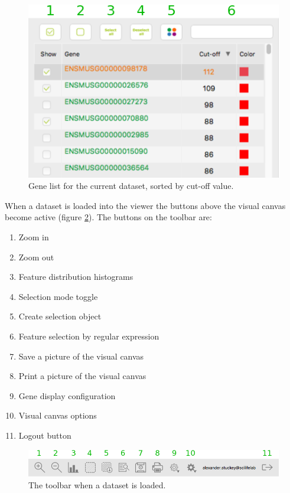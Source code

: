 \documentclass[10pt,a4paper,titlepage]{book}
\begin{document}
\begin{figure}[h]
	\centering
	\includegraphics[scale=0.7]{./Pictures/gene_list}
	\caption[Gene List]{Gene list for the current dataset, sorted by cut-off value.}
	\label{fig:gene_list}
\end{figure}

When a dataset is loaded into the viewer the buttons above the visual canvas become active (figure \ref{fig:toolbar_data_loaded}). The buttons on the toolbar are:
\begin{enumerate}
\item	Zoom in
\item	Zoom out
\item	Feature distribution histograms
\item	Selection mode toggle
\item	Create selection object
\item	Feature selection by regular expression
\item	Save a picture of the visual canvas
\item	Print a picture of the visual canvas
\item	Gene display configuration
\item	Visual canvas options
\item	Logout button
\end{enumerate}

\begin{figure}[h]
	\centering
	\includegraphics[width=0.8\linewidth]{./Pictures/toolbar_data_loaded}
	\caption{The toolbar when a dataset is loaded.}
	\label{fig:toolbar_data_loaded}
\end{figure}
\end{document}
